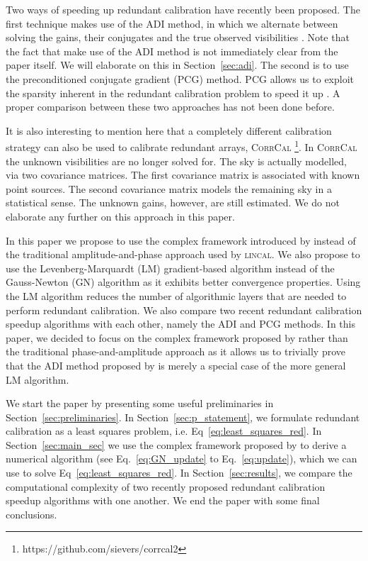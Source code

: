 \documentclass[useAMS,usenatbib]{mn2e}
\begin{document}
Two ways of speeding up redundant calibration have recently been proposed. The first technique makes use of the ADI method, in which we alternate between solving the gains, their conjugates and 
the true observed visibilities \citep{Wijnholds2012,Marthi2014}. Note that the fact that \citet{Marthi2014} make use of the ADI method is not immediately clear
from the paper itself. We will elaborate on this in Section~\ref{sec:adi}. The second is to use the preconditioned conjugate gradient (PCG) method. PCG allows us to exploit the sparsity inherent in the redundant calibration problem 
to speed it up \citep{Liu2010}. A proper comparison between these two approaches has not been done before.

It is also interesting to mention here that a completely different calibration strategy can also be used to calibrate redundant arrays, \textsc{CorrCal} \citep{Sievers2017}\footnote{https://github.com/sievers/corrcal2}. In \textsc{CorrCal} the unknown 
visibilities are no longer solved for. The sky is actually modelled, via two covariance matrices. 
The first covariance matrix is associated with known point sources. The second covariance matrix models the remaining sky in a statistical sense. The unknown gains, however, are still 
estimated. We do not elaborate any further on this approach in this paper.   

In this paper we propose to use the complex framework introduced by \citet{Smirnov2015} instead of the traditional amplitude-and-phase approach used by \textsc{lincal}.
We also propose to use the Levenberg-Marquardt (LM) gradient-based algorithm instead of the Gauss-Newton (GN) algorithm as it exhibits better convergence properties.
Using the LM algorithm reduces the number of algorithmic layers that are needed to perform redundant calibration. 
We also compare two recent redundant calibration speedup algorithms with each other, namely the ADI \citep{Marthi2014} and PCG \citep{Liu2010} methods. In this paper, we decided to focus on the complex framework proposed by \citet{Smirnov2015} rather than the traditional phase-and-amplitude approach as it 
allows us to trivially prove that the ADI method proposed by \citep{Marthi2014} is merely a special case of the more general LM algorithm. 


We start the paper by presenting some useful preliminaries in Section~\ref{sec:preliminaries}. In Section~\ref{sec:p_statement}, we formulate redundant calibration 
as a least squares problem, i.e. Eq~\eqref{eq:least_squares_red}. In Section~\ref{sec:main_sec} we use the complex framework proposed by \citet{Smirnov2015} to derive a numerical
algorithm (see Eq.~\eqref{eq:GN_update} to Eq.~\eqref{eq:update}), which we can use to solve Eq~\eqref{eq:least_squares_red}. In Section~\ref{sec:results}, we compare the computational complexity of two recently proposed redundant calibration speedup algorithms with one another.
We end the paper with some final conclusions.
\end{document}
